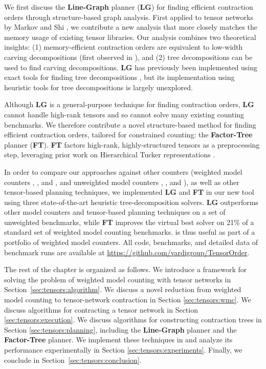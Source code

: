 We first discuss the \textbf{Line-Graph} planner (\textbf{LG}) for finding efficient contraction orders through structure-based graph analysis. First applied to tensor networks by Markov and Shi \cite{MS08}, we contribute a new analysis that more closely matches the memory usage of existing tensor libraries. Our analysis combines two theoretical insights: (1) memory-efficient contraction orders are equivalent to low-width carving decompositions (first observed in \cite{de15}), and (2) tree decompositions can be used to find carving decompositions. \textbf{LG} has previously been implemented using exact tools for finding tree decompositions \cite{DFGHSW18}, but its implementation using heuristic tools for tree decompositions is largely unexplored.

Although \textbf{LG} is a general-purpose technique for finding contraction orders, \textbf{LG} cannot handle high-rank tensors and so cannot solve many existing counting benchmarks. We therefore contribute a novel structure-based method for finding efficient contraction orders, tailored for constrained counting: the \textbf{Factor-Tree} planner (\textbf{FT}). \textbf{FT} factors high-rank, highly-structured tensors as a preprocessing step, leveraging prior work on Hierarchical Tucker representations \cite{Grasedyck10}.

In order to compare our approaches against other counters (weighted model counters  \cite{SBK05},  \cite{OD15}, and  \cite{LM17}, and unweighted model counters  \cite{CW16},  \cite{FHMW17}, and  \cite{Thurley2006}), as well as other tensor-based planning techniques, we implemented \textbf{LG} and \textbf{FT} in our new tool  using three state-of-the-art heuristic tree-decomposition solvers. \textbf{LG} outperforms other model counters and tensor-based planning techniques on a set of unweighted benchmarks, while \textbf{FT} improves the virtual best solver on 21\% of a standard set of weighted model counting benchmarks.  is thus useful as part of a portfolio of weighted model counters. All code, benchmarks, and detailed data of benchmark runs are available at \url{https://github.com/vardigroup/TensorOrder}.


The rest of the chapter is organized as follows. We introduce a framework for solving the problem of weighted model counting with tensor networks in Section~\ref{sec:tensors:algorithm}.
We discuss a novel reduction from weighted model counting to tensor-network contraction in Section \ref{sec:tensors:wmc}.
We discuss algorithms for contracting a tensor network in Section \ref{sec:tensors:execution}.
We discuss algorithms for constructing contraction trees in Section \ref{sec:tensors:planning}, including the \textbf{Line-Graph} planner and the \textbf{Factor-Tree} planner.
We implement these techniques in  and analyze its performance experimentally in Section \ref{sec:tensors:experiments}.
Finally, we conclude in Section~\ref{sec:tensors:conclusion}.
